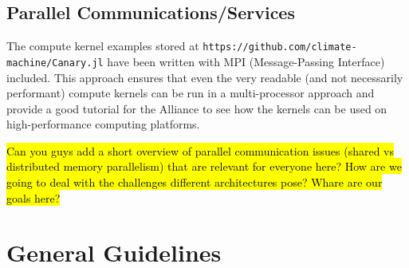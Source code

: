\documentclass{article}
\begin{document}
\subsection{Parallel Communications/Services}
The compute kernel examples stored at \texttt{https://github.com/climate-machine/Canary.jl} have been written with MPI (Message-Passing Interface) included.  This approach ensures that even the very readable (and not necessarily performant) compute kernels can be run in a multi-processor approach and provide a good tutorial for the Alliance to see how the kernels can be used on high-performance computing platforms.

\hl{Can you guys add a short overview of parallel communication issues (shared vs distributed memory parallelism) that are relevant for everyone here? How are we going to deal with the challenges different architectures pose? Whare are our goals here?}

\section{General Guidelines}
\end{document}
